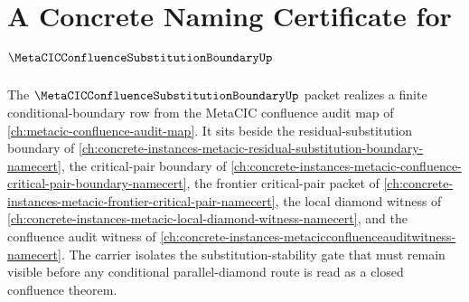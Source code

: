 \chapter{A Concrete Naming Certificate for $\MetaCICConfluenceSubstitutionBoundaryUp$}
\label{ch:concrete-instances-metacic-confluence-substitution-boundary-namecert}

The $\MetaCICConfluenceSubstitutionBoundaryUp$ packet realizes a finite conditional-boundary row from the MetaCIC confluence audit map of \autoref{ch:metacic-confluence-audit-map}. It sits beside the residual-substitution boundary of \autoref{ch:concrete-instances-metacic-residual-substitution-boundary-namecert}, the critical-pair boundary of \autoref{ch:concrete-instances-metacic-confluence-critical-pair-boundary-namecert}, the frontier critical-pair packet of \autoref{ch:concrete-instances-metacic-frontier-critical-pair-namecert}, the local diamond witness of \autoref{ch:concrete-instances-metacic-local-diamond-witness-namecert}, and the confluence audit witness of \autoref{ch:concrete-instances-metacicconfluenceauditwitness-namecert}. The carrier isolates the substitution-stability gate that must remain visible before any conditional parallel-diamond route is read as a closed confluence theorem.

